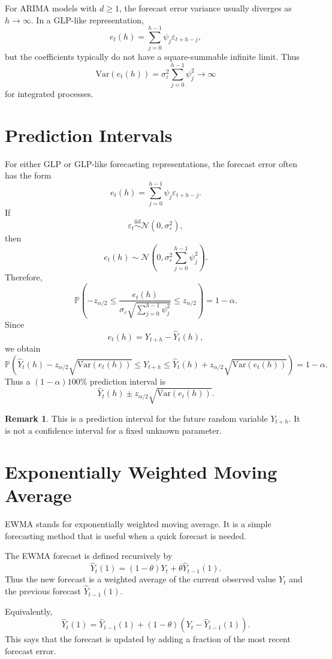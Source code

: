 \documentclass[12pt,oneside]{book}
\numberwithin{equation}{section}
\theoremstyle{definition}
\newtheorem{remark}{Remark}[section]
\theoremstyle{plain}
\theoremstyle{remark}
\newcommand{\Var}{\mathrm{Var}}
\newcommand{\Prob}{\mathbb{P}}
\newcommand{\iid}{\overset{\text{iid}}{\sim}}
\newcommand{\Normal}{\mathcal{N}}
\begin{document}
For ARIMA models with $d\geq 1$, the forecast error variance usually diverges as $h\to\infty$. In a GLP-like representation,
\[
e_t(h)
=
\sum_{j=0}^{h-1}\psi_j\varepsilon_{t+h-j},
\]
but the coefficients typically do not have a square-summable infinite limit. Thus
\[
\Var(e_t(h))
=
\sigma_\varepsilon^2\sum_{j=0}^{h-1}\psi_j^2
\to \infty
\]
for integrated processes.

\section{Prediction Intervals}

For either GLP or GLP-like forecasting representations, the forecast error often has the form
\[
e_t(h)
=
\sum_{j=0}^{h-1}\psi_j\varepsilon_{t+h-j}.
\]
If
\[
\varepsilon_t\iid \Normal(0,\sigma_\varepsilon^2),
\]
then
\[
e_t(h)
\sim
\Normal\left(
0,
\sigma_\varepsilon^2\sum_{j=0}^{h-1}\psi_j^2
\right).
\]
Therefore,
\[
\Prob\left(
-z_{\alpha/2}
\leq
\frac{e_t(h)}
{\sigma_\varepsilon\sqrt{\sum_{j=0}^{h-1}\psi_j^2}}
\leq
z_{\alpha/2}
\right)
=
1-\alpha.
\]
Since
\[
e_t(h)=Y_{t+h}-\widehat{Y}_t(h),
\]
we obtain
\[
\Prob\left(
\widehat{Y}_t(h)
-
z_{\alpha/2}\sqrt{\Var(e_t(h))}
\leq
Y_{t+h}
\leq
\widehat{Y}_t(h)
+
z_{\alpha/2}\sqrt{\Var(e_t(h))}
\right)
=
1-\alpha.
\]
Thus a $(1-\alpha)100\%$ prediction interval is
\[
\widehat{Y}_t(h)
\pm
z_{\alpha/2}\sqrt{\Var(e_t(h))}.
\]

\begin{remark}
This is a prediction interval for the future random variable $Y_{t+h}$. It is not a confidence interval for a fixed unknown parameter.
\end{remark}

\section{Exponentially Weighted Moving Average}

EWMA stands for exponentially weighted moving average. It is a simple forecasting method that is useful when a quick forecast is needed.

The EWMA forecast is defined recursively by
\[
\widehat{Y}_t(1)
=
(1-\theta)Y_t+\theta\widehat{Y}_{t-1}(1).
\]
Thus the new forecast is a weighted average of the current observed value $Y_t$ and the previous forecast $\widehat{Y}_{t-1}(1)$.

Equivalently,
\[
\widehat{Y}_t(1)
=
\widehat{Y}_{t-1}(1)
+
(1-\theta)\left(Y_t-\widehat{Y}_{t-1}(1)\right).
\]
This says that the forecast is updated by adding a fraction of the most recent forecast error.
\end{document}
